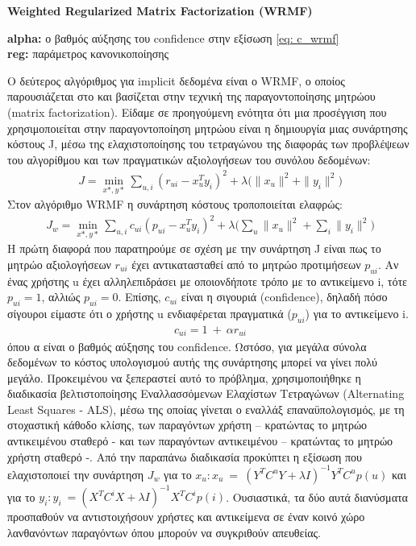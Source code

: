 \newpage
\noindent\textbf{Weighted Regularized Matrix Factorization (WRMF) }
\begin{tcolorbox}[
	colframe=blue!25,
	colback=blue!10,
	coltitle=blue!20!black,  
	fonttitle=\bfseries,
	adjusted title= Υπερπαράμετροι]	
	
	\textbf{alpha:} ο βαθμός αύξησης του confidence στην εξίσωση \eqref{eq: c_wrmf}\\ 
	\textbf{reg:} παράμετρος κανονικοποίησης	%
\end{tcolorbox}
\noindent Ο δεύτερος αλγόριθμος για implicit δεδομένα είναι ο WRMF, ο οποίος παρουσιάζεται στο \cite{huCollaborativeFilteringImplicit2008} και βασίζεται στην τεχνική της παραγοντοποίησης μητρώου (matrix factorization). Είδαμε σε προηγούμενη ενότητα ότι μια προσέγγιση που χρησιμοποιείται στην παραγοντοποίηση μητρώου είναι η δημιουργία μιας συνάρτησης κόστους J, μέσω της ελαχιστοποίησης του τετραγώνου της διαφοράς των προβλέψεων του αλγορίθμου και των πραγματικών αξιολογήσεων του συνόλου δεδομένων:
\begin{align}	
	J = \min_{x*,y*} \sum_{u,i} (r_{ui}-x_u^Ty_i)^2 + λ\Bigg(\| x_{u}\| ^2 + \|{y_{i}}\|^2 \Bigg)
\end{align}
Στον αλγόριθμο WRMF η συνάρτηση κόστους τροποποιείται ελαφρώς:
\begin{align}	
 J_w = \min_{x*,y*} \sum_{u,i} c_{ui}(p_{ui}-x_u^Ty_i)^2 + λ\Bigg(\sum_{u}\| x_{u}\| ^2 + \sum_{i} \|{y_{i}}\|^2 \Bigg) 
 \label{eq: wrmf}
\end{align}	
 Η πρώτη διαφορά που παρατηρούμε σε σχέση με την συνάρτηση J είναι πως το μητρώο αξιολογήσεων $ r_{ui} $ έχει αντικατασταθεί από το μητρώο προτιμήσεων $ p_{ui} $. Αν ένας χρήστης u έχει αλληλεπιδράσει με οποιονδήποτε τρόπο με το αντικείμενο i, τότε $ p_{ui} = 1 $, αλλιώς $ p_{ui} = 0 $.  Επίσης, $ c_{ui} $ είναι η σιγουριά (confidence), δηλαδή πόσο σίγουροι είμαστε ότι ο χρήστης u ενδιαφέρεται πραγματικά ($ p_{ui} $) για το αντικείμενο i.
 \begin{align}	
c_{ui}=1\ +\ \alpha r_{ui} 
\label{eq: c_wrmf}
\end{align}
όπου α είναι ο βαθμός αύξησης του confidence.
Ωστόσο, για μεγάλα σύνολα δεδομένων το κόστος υπολογισμού αυτής της συνάρτησης μπορεί να γίνει πολύ μεγάλο. Προκειμένου να ξεπεραστεί αυτό το πρόβλημα, χρησιμοποιήθηκε η διαδικασία βελτιστοποίησης Εναλλασσόμενων Ελαχίστων Τετραγώνων (Alternating Least Squares - ALS), μέσω της οποίας γίνεται ο εναλλάξ επαναϋπολογισμός, με τη στοχαστική κάθοδο κλίσης, των παραγόντων χρήστη – κρατώντας το μητρώο αντικειμένου σταθερό - και των παραγόντων αντικειμένου – κρατώντας το μητρώο χρήστη σταθερό -. Από την παραπάνω διαδικασία προκύπτει η εξίσωση που ελαχιστοποιεί την συνάρτηση $ J_w $ για το $  x_u :  x_u\ =\ (Y^TC^uY + λΙ)^{-1}Y^TC^up(u) $ και για το $  y_i : y_i\ =(X^TC^iX + λΙ)^{-1}X^TC^ip(i) $. Ουσιαστικά, τα δύο αυτά διανύσματα προσπαθούν να αντιστοιχήσουν χρήστες και αντικείμενα σε έναν κοινό χώρο λανθανόντων παραγόντων όπου μπορούν να συγκριθούν απευθείας.
